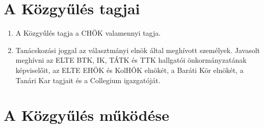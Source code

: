 \documentclass{../styles/rulebook}
\begin{document}
\section{A Közgyűlés tagjai}

\begin{enumerate}
	\item A Közgyűlés tagja a CHÖK valamennyi tagja.
	\item Tanácskozási joggal az választmányi elnök által meghívott személyek. Javasolt meghívni az ELTE BTK, IK, TÁTK és TTK hallgatói önkormányzatának képviselőit, az ELTE EHÖK és KolHÖK elnökét, a Baráti Kör elnökét, a Tanári Kar tagjait és a Collegium igazgatóját.
\end{enumerate}

\section{A Közgyűlés működése}
\end{document}
